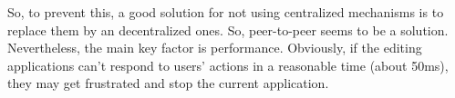 So, to prevent this, a good solution for not using centralized mechanisms is to replace them by an decentralized ones. So, peer-to-peer seems to be a solution. Nevertheless, the main key factor is performance. Obviously, if the editing applications can't respond to users' actions in a reasonable time (about 50ms), they may get frustrated and stop the current application.